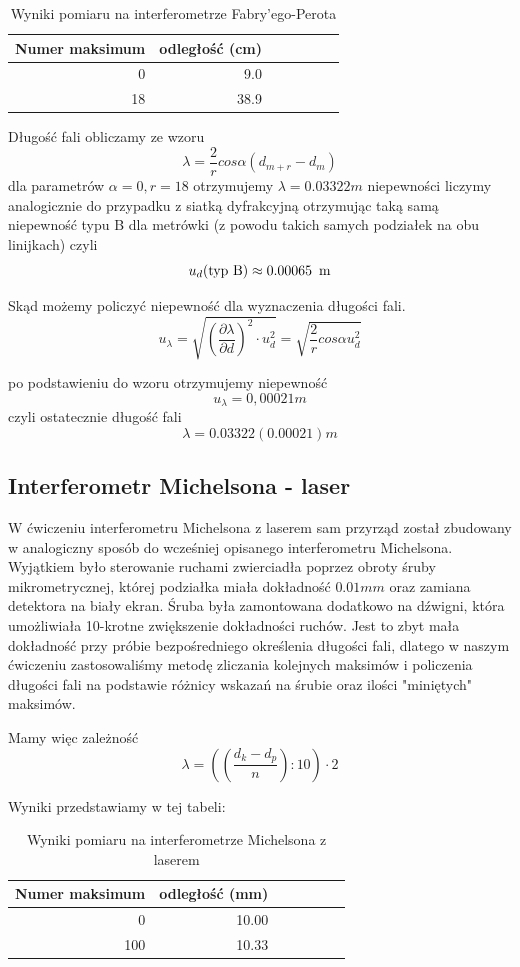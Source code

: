 \documentclass[a4paper]{article}
\newlength{\du}
\begin{document}
\begin{table}[h!]
\centering
\begin{tabular}{rrrrrrr}
\toprule
Numer maksimum & odległość (cm) \\
\midrule
0 & 9.0 \\
18 & 38.9 \\
\bottomrule
\end{tabular}
\caption{Wyniki pomiaru na interferometrze Fabry'ego-Perota}
\label{pomiary_fabry_perot}
\end{table}

Długość fali obliczamy ze wzoru
$$\lambda = \frac{2}{r}cos \alpha (d_{m+r} - d_{m})$$
dla parametrów
$\alpha = 0, r = 18$
otrzymujemy $\lambda = 0.03322 m$
niepewności liczymy analogicznie do przypadku z siatką dyfrakcyjną otrzymując taką samą niepewność typu B dla metrówki (z powodu takich samych podziałek na obu linijkach) czyli
$$u_d (\text{typ B}) \approx 0.00065 \enskip \text{m}$$

Skąd możemy policzyć niepewność dla wyznaczenia długości fali. 
$$u_{\lambda} = \sqrt{(\frac{\partial \lambda}{\partial d})^2 \cdot u_d^2 } = \sqrt{\frac{2}{r}cos \alpha u_d^2}$$

po podstawieniu do wzoru otrzymujemy niepewność
$$u_{\lambda} = 0,00021 m$$
czyli ostatecznie długość fali $$\lambda = 0.03322(0.00021)m$$

\subsection{Interferometr Michelsona - laser}
W ćwiczeniu interferometru Michelsona z laserem sam przyrząd został zbudowany w analogiczny sposób
do wcześniej opisanego interferometru Michelsona.
Wyjątkiem było sterowanie ruchami zwierciadła poprzez obroty śruby mikrometrycznej, której podziałka
miała dokładność $0.01 mm$ oraz zamiana detektora na biały ekran.
Śruba była zamontowana dodatkowo na dźwigni, która umożliwiała 10-krotne zwiększenie dokładności ruchów.
Jest to zbyt mała dokładność przy próbie bezpośredniego określenia długości fali, dlatego w naszym ćwiczeniu
zastosowaliśmy metodę zliczania kolejnych maksimów
i policzenia długości fali na podstawie różnicy wskazań na śrubie oraz ilości "miniętych" maksimów.

Mamy więc zależność
$$\lambda = ((\frac{d_{k} - d_{p}}{n}):10) \cdot 2$$

Wyniki przedstawiamy w tej tabeli:


\begin{table}[h!]
\centering
\begin{tabular}{rrrrrrr}
\toprule
Numer maksimum & odległość (mm) \\
\midrule
0 & 10.00 \\
100 & 10.33 \\
\bottomrule
\end{tabular}
\caption{Wyniki pomiaru na interferometrze Michelsona z laserem}
\label{pomiary_michelsona_laser}
\end{table}
\end{document}
